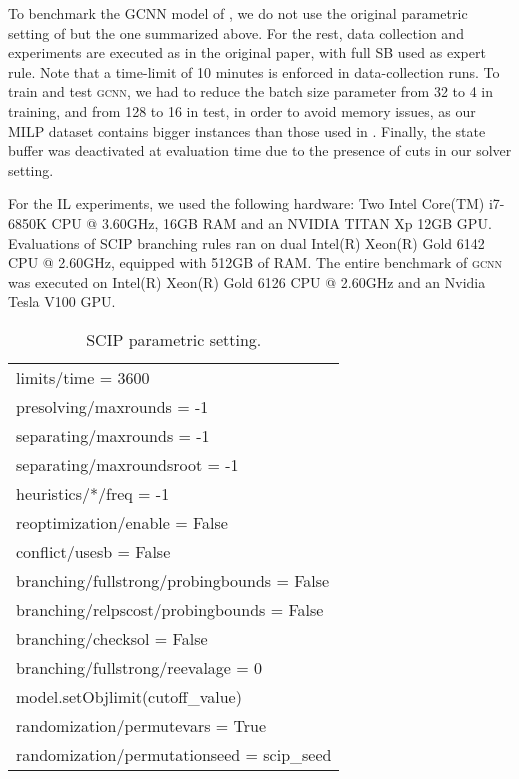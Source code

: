 \documentclass[letterpaper]{article} %
\begin{document}
To benchmark the GCNN model of \citeauthor{NIPS2019_9690}, we do not use the original parametric setting of \citeauthor{NIPS2019_9690} but the one summarized above. For the rest, data collection and experiments are executed as in the original paper, with full SB used as expert rule. Note that a time-limit of 10 minutes is enforced in data-collection runs. To train and test \textsc{gcnn}, we had to reduce the batch size parameter from 32 to 4 in training, and from 128 to 16 in test, in order to avoid memory issues, as our MILP dataset contains bigger instances than those used in \citeauthor{NIPS2019_9690}. Finally, the state buffer was deactivated at evaluation time due to the presence of cuts in our solver setting.

For the IL experiments, we used the following hardware: Two Intel Core(TM) i7-6850K CPU @ 3.60GHz, 16GB RAM and an NVIDIA TITAN Xp 12GB GPU. Evaluations of SCIP branching rules ran on dual Intel(R) Xeon(R) Gold 6142 CPU @ 2.60GHz, equipped with 512GB of RAM. The entire benchmark of \textsc{gcnn} was executed on Intel(R) Xeon(R) Gold 6126 CPU @ 2.60GHz and an Nvidia Tesla V100 GPU.

\begin{table}[h]
    \caption{SCIP parametric setting.}
    \label{tab:params}
    \centering
    \begin{footnotesize}
    \begin{tabular}{l}
    \toprule
    limits/time = 3600\\
    presolving/maxrounds = -1\\
    separating/maxrounds = -1\\
    separating/maxroundsroot = -1\\
    heuristics/*/freq = -1\\
    reoptimization/enable = False\\
    conflict/usesb = False\\
    branching/fullstrong/probingbounds = False\\
    branching/relpscost/probingbounds = False\\
    branching/checksol = False\\
    branching/fullstrong/reevalage = 0\\
    model.setObjlimit(cutoff\_value)\\
    randomization/permutevars = True\\
    randomization/permutationseed = scip\_seed\\
    \bottomrule
    \end{tabular}
    \end{footnotesize}
\end{table}
\end{document}
